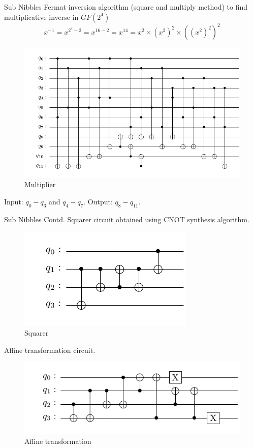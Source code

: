 \begin{frame}{Sub Nibbles}
    Fermat inversion algorithm (square and multiply method) to find multiplicative inverse in $GF(2^4)$
    \pause
    \begin{equation*}
        x^{-1} = x^{2^4 - 2} = x^{16-2} = x^{14} = x^{2} \times (x^{2})^{2} \times ((x^{2})^{2})^{2}
    \end{equation*}
    \pause
    \begin{figure}[h!]
        \centering
        \includegraphics[width=0.5\linewidth]{saes18/multiplier.pdf}
        \caption{Multiplier }
        \label{fig:mul}
    \end{figure}
    Input: $q_0 - q_3$ and $q_4 - q_7$. Output: $q_8 - q_{11}$.
\end{frame}
\begin{frame}{Sub Nibbles Contd.}
Squarer circuit obtained using CNOT synthesis algorithm.

\begin{figure}[h!]
    \centering
    \includegraphics[width=0.4\linewidth]{saes18/squarer.pdf}
    \caption{Squarer}
    \label{fig:sq}
\end{figure}

Affine transformation circuit.
\begin{figure}[h!]
    \centering
    \includegraphics[width=0.7\linewidth]{saes18/affine.pdf}
    \caption{Affine transformation}
    \label{fig:aff}
\end{figure}
\end{frame}

